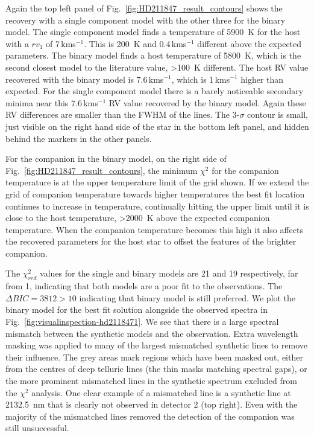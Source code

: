 \documentclass[fleqn,usenatbib]{mnras}
\newcommand{\kmps}{\,kms\(^{-1}\)}	%
\begin{document}
Again the top left panel of Fig.~\ref{fig:HD211847_result_contours} shows the recovery with a single component model with the other three for the binary model. The single component model finds a temperature of 5900~K for the host with a \({rv}_1\) of 7\kmps{}. This is 200~K and 0.4\kmps{} different above the expected parameters. The binary model finds a host temperature of 5800~K, which is the second closest model to the literature value, >100~K different. The host RV value recovered with the binary model is 7.6\kmps{}, which is 1\kmps{} higher than expected.  For the single component model there is a barely noticeable secondary minima near this 7.6\kmps{} RV value recovered by the binary model. Again these RV differences are smaller than the FWHM of the lines. The 3-\(\sigma\) contour is small, just visible on the right hand side of the star in the bottom left panel, and hidden behind the markers in the other panels.


For the companion in the binary model, on the right side of Fig.~\ref{fig:HD211847_result_contours}, the minimum \(\chi^2\) for the companion temperature is at the upper temperature limit of the grid shown. If we extend the grid of companion temperature towards higher temperatures the best fit location continues to increase in temperature, continually hitting the upper limit until it is close to the host temperature, >2000~K above the expected companion temperature. When the companion temperature becomes this high it also affects the recovered parameters for the host star to offset the features of the brighter companion.

The \(\chi^2_{red}\) values for the single and binary models are 21 and 19 respectively, far from 1, indicating that both models are a poor fit to the observations. {The $\Delta BIC = 3812 >10$ indicating that binary model is still preferred.} We plot the binary model for the best fit solution alongside the observed spectra in Fig.~\ref{fig:visualinspection-hd2118471}. We see that there is a large spectral mismatch between the synthetic models and the observation. Extra wavelength masking was applied to many of the largest mismatched synthetic lines to remove their influence. The grey areas mark regions which have been masked out, either from the centres of deep telluric lines (the thin masks matching spectral gaps), or the more prominent mismatched lines in the synthetic spectrum excluded from the \(\chi^2\) analysis. One clear example of a mismatched line is a synthetic line at 2132.5~nm that is clearly not observed in detector 2 (top right). Even with the majority of the mismatched lines removed the detection of the companion was still unsuccessful.
\end{document}
